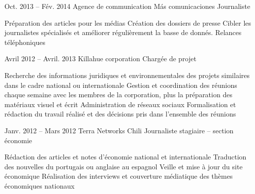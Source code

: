 \documentclass{tccv}
\begin{document}
\begin{eventlist}
\begin{itemize}
    \end{itemize}     

\item{Oct. 2013 -- Fév. 2014 }     
  {Agence de communication Más comunicaciones}     
  {Journaliste}

\begin{itemize}
      \setlength\itemsep{0cm} 
      \cvitem[\checkmark] Préparation des articles pour les médias
      \cvitem[\checkmark] Création des dossiers de presse 
      \cvitem[\checkmark] Cibler les journalistes spécialisés et améliorer régulièrement la basse de donnés. 
      \cvitem[\checkmark] Relances téléphoniques
\end{itemize}       



\item{Avril 2012 -- Avril. 2013 }     
  {Killahue corporation}     
  {Chargée de projet}

\begin{itemize}
      \setlength\itemsep{0cm} 
      \cvitem[\checkmark] Recherche des informations juridiques et environnementales des projets similaires dans le cadre national ou internationale
      \cvitem[\checkmark] Gestion et coordination des réunions chaque semaine avec les membres de la corporation, plus la préparation des matériaux visuel et écrit
      \cvitem[\checkmark] Administration de réseaux sociaux 
      \cvitem[\checkmark] Formalisation et rédaction du travail réalisé et des décisions pris dans l’ensemble des réunions

\end{itemize}      
    

\item{Janv. 2012 -- Mars 2012 }     
  {Terra Networks Chili}     
  {Journaliste stagiaire – section économie}

\begin{itemize}
      \setlength\itemsep{0cm} 
      \cvitem[\checkmark] Rédaction des articles et notes d’économie national et internationale
      \cvitem[\checkmark] Traduction des nouvelles du portugais ou anglaise au espagnol
      \cvitem[\checkmark] Veille et mise à jour du site économique
      \cvitem[\checkmark] Réalisation des interviews et couverture médiatique des thèmes économiques nationaux

\end{itemize}        
   
   


\end{eventlist}
\end{document}
